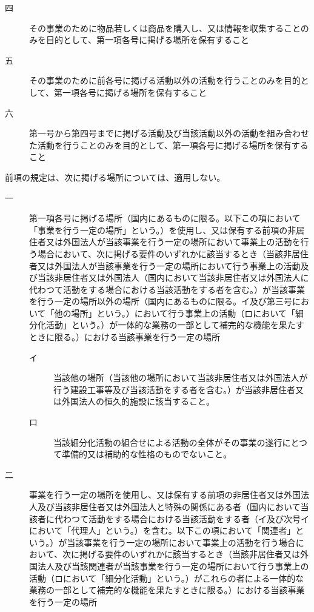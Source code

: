 \documentclass[twocolumn,a4j,10pt]{ltjtarticle}
\begin{document}
\begin{description}
\begin{description}
\item[四]その事業のために物品若しくは商品を購入し、又は情報を収集することのみを目的として、第一項各号に掲げる場所を保有すること
\item[五]その事業のために前各号に掲げる活動以外の活動を行うことのみを目的として、第一項各号に掲げる場所を保有すること
\item[六]第一号から第四号までに掲げる活動及び当該活動以外の活動を組み合わせた活動を行うことのみを目的として、第一項各号に掲げる場所を保有すること
\end{description}
\item[\rensuji{5}]前項の規定は、次に掲げる場所については、適用しない。
\begin{description}
\item[一]第一項各号に掲げる場所（国内にあるものに限る。以下この項において「事業を行う一定の場所」という。）を使用し、又は保有する前項の非居住者又は外国法人が当該事業を行う一定の場所において事業上の活動を行う場合において、次に掲げる要件のいずれかに該当するとき（当該非居住者又は外国法人が当該事業を行う一定の場所において行う事業上の活動及び当該非居住者又は外国法人（国内において当該非居住者又は外国法人に代わつて活動をする場合における当該活動をする者を含む。）が当該事業を行う一定の場所以外の場所（国内にあるものに限る。イ及び第三号において「他の場所」という。）において行う事業上の活動（ロにおいて「細分化活動」という。）が一体的な業務の一部として補完的な機能を果たすときに限る。）における当該事業を行う一定の場所
\begin{description}
\item[イ]当該他の場所（当該他の場所において当該非居住者又は外国法人が行う建設工事等及び当該活動をする者を含む。）が当該非居住者又は外国法人の恒久的施設に該当すること。
\item[ロ]当該細分化活動の組合せによる活動の全体がその事業の遂行にとつて準備的又は補助的な性格のものでないこと。
\end{description}
\item[二]事業を行う一定の場所を使用し、又は保有する前項の非居住者又は外国法人及び当該非居住者又は外国法人と特殊の関係にある者（国内において当該者に代わつて活動をする場合における当該活動をする者（イ及び次号イにおいて「代理人」という。）を含む。以下この項において「関連者」という。）が当該事業を行う一定の場所において事業上の活動を行う場合において、次に掲げる要件のいずれかに該当するとき（当該非居住者又は外国法人及び当該関連者が当該事業を行う一定の場所において行う事業上の活動（ロにおいて「細分化活動」という。）がこれらの者による一体的な業務の一部として補完的な機能を果たすときに限る。）における当該事業を行う一定の場所

\end{description}
\end{description}
\end{document}
